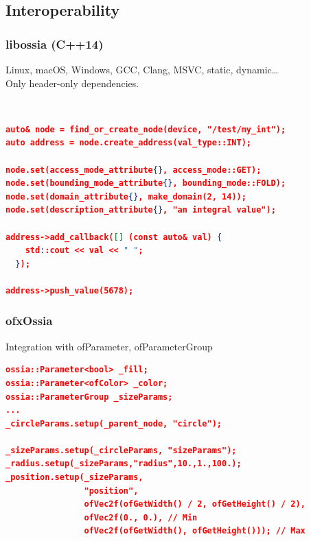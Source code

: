 \documentclass[handout]{beamer}
\begin{document}
\subsection{Interoperability}

\begin{frame}[fragile]
\frametitle{libossia (C++14)}
Linux, macOS, Windows, GCC, Clang, MSVC, static, dynamic\dots
~\\
Only header-only dependencies.

~\\
\footnotesize
\begin{lstlisting}[language=json]
auto& node = find_or_create_node(device, "/test/my_int");
auto address = node.create_address(val_type::INT);

node.set(access_mode_attribute{}, access_mode::GET);
node.set(bounding_mode_attribute{}, bounding_mode::FOLD);
node.set(domain_attribute{}, make_domain(2, 14));
node.set(description_attribute{}, "an integral value");

address->add_callback([] (const auto& val) {
    std::cout << val << " ";
  });

address->push_value(5678);
\end{lstlisting}
\end{frame}

\begin{frame}[fragile]
\frametitle{ofxOssia}
\Large Integration with ofParameter, ofParameterGroup
~\\
\footnotesize
\begin{lstlisting}[language=json]
ossia::Parameter<bool> _fill;
ossia::Parameter<ofColor> _color;
ossia::ParameterGroup _sizeParams;
...
_circleParams.setup(_parent_node, "circle");

_sizeParams.setup(_circleParams, "sizeParams");
_radius.setup(_sizeParams,"radius",10.,1.,100.);
_position.setup(_sizeParams,
                "position",
                ofVec2f(ofGetWidth() / 2, ofGetHeight() / 2),
                ofVec2f(0., 0.), // Min
                ofVec2f(ofGetWidth(), ofGetHeight())); // Max
\end{lstlisting}
\end{frame}
\end{document}
